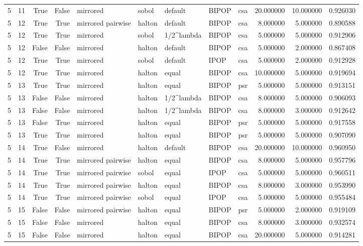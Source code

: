 \begin{tabular}{rrrrlllllrrr}
5 & 11 & True & False & mirrored & sobol & default & BIPOP & csa & 20.000000 & 10.000000 & 0.926030 \\
5 & 12 & True & True & mirrored pairwise & halton & default & BIPOP & csa & 8.000000 & 5.000000 & 0.890588 \\
5 & 12 & True & True & mirrored & sobol & 1/2^lambda & BIPOP & csa & 5.000000 & 5.000000 & 0.912906 \\
5 & 12 & False & False & mirrored & halton & default & BIPOP & csa & 5.000000 & 2.000000 & 0.867408 \\
5 & 12 & True & True & mirrored & sobol & default & IPOP & csa & 5.000000 & 2.000000 & 0.912928 \\
5 & 12 & True & True & mirrored & halton & equal & BIPOP & csa & 10.000000 & 5.000000 & 0.919694 \\
5 & 13 & True & True & mirrored & halton & equal & BIPOP & psr & 5.000000 & 5.000000 & 0.913151 \\
5 & 13 & False & False & mirrored & halton & 1/2^lambda & BIPOP & csa & 8.000000 & 5.000000 & 0.906093 \\
5 & 13 & False & False & mirrored & halton & 1/2^lambda & BIPOP & csa & 8.000000 & 3.000000 & 0.912642 \\
5 & 13 & False & True & mirrored & halton & equal & BIPOP & psr & 5.000000 & 5.000000 & 0.917558 \\
5 & 13 & True & True & mirrored & halton & equal & BIPOP & psr & 5.000000 & 5.000000 & 0.907090 \\
5 & 14 & True & False & mirrored & halton & default & BIPOP & csa & 20.000000 & 10.000000 & 0.960950 \\
5 & 14 & True & True & mirrored pairwise & halton & equal & BIPOP & csa & 8.000000 & 5.000000 & 0.957796 \\
5 & 14 & True & True & mirrored pairwise & sobol & equal & IPOP & csa & 5.000000 & 5.000000 & 0.960511 \\
5 & 14 & True & True & mirrored pairwise & halton & equal & BIPOP & csa & 8.000000 & 3.000000 & 0.953990 \\
5 & 14 & True & True & mirrored pairwise & sobol & equal & IPOP & csa & 5.000000 & 5.000000 & 0.955484 \\
5 & 15 & False & False & mirrored pairwise & halton & equal & BIPOP & psr & 5.000000 & 2.000000 & 0.919109 \\
5 & 15 & False & False & mirrored & halton & equal & BIPOP & csa & 8.000000 & 3.000000 & 0.932574 \\
5 & 15 & False & False & mirrored & halton & equal & BIPOP & csa & 20.000000 & 5.000000 & 0.914281 \\

\end{tabular}

